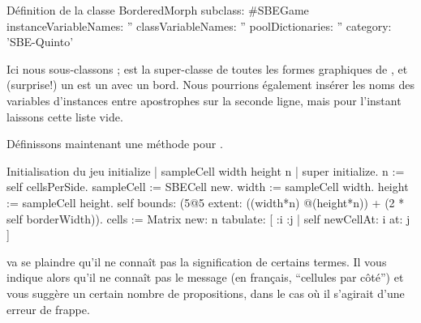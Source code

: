 \documentclass[a4paper,10pt,twoside]{book}
\begin{document}
\begin{classdef}[sbegame]{Définition de la classe }
BorderedMorph subclass: #SBEGame
   instanceVariableNames: ''
   classVariableNames: ''
   poolDictionaries: ''
   category: 'SBE-Quinto'
\end{classdef}

Ici nous sous-classons ;  est la
super-classe de toutes les formes graphiques de \sq, et (surprise!)
un  est un  avec un bord.  
Nous pourrions également insérer les noms des variables d'instances
entre apostrophes sur la seconde ligne, mais pour l'instant 
laissons cette liste vide.

Définissons maintenant une méthode  pour .


\begin{numMethod}[sbegameinitialize]{Initialisation du jeu}
initialize
   | sampleCell width height n |
   super initialize.
   n := self cellsPerSide.
   sampleCell := SBECell new.
   width := sampleCell width.
   height := sampleCell height.
   self bounds: (5@5 extent: ((width*n) @(height*n)) + (2 * self borderWidth)).
   cells := Matrix new: n tabulate: [ :i :j | self newCellAt: i at: j ]
\end{numMethod}


\sq va se plaindre qu'il ne conna\^it pas la signification de
certains termes.
Il vous indique alors qu'il ne conna\^it pas le message
 (en fran\c{c}ais, ``cellules par c\^oté'') et
vous suggère un certain nombre de propositions, dans le cas o\`u il
s'agirait d'une erreur de frappe.
\end{document}
